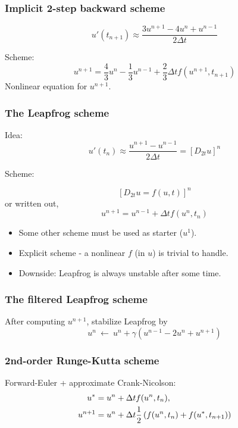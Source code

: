 \documentclass{beamer}
\begin{document}
\begin{frame}
\frametitle{Implicit 2-step backward scheme}

 

\[ u'(t_{n+1}) \approx \frac{3u^{n+1} - 4u^{n} + u^{n-1}}{2\Delta t}\]

Scheme:
\[ u^{n+1} = \frac{4}{3}u^n - \frac{1}{3}u^{n-1} +
\frac{2}{3}\Delta t f(u^{n+1}, t_{n+1})
\label{decay:fd2:bw:2step}
\]
Nonlinear equation for $u^{n+1}$.
\end{frame}

\begin{frame}
\frametitle{The Leapfrog scheme}


Idea:
\begin{equation}
u'(t_n)\approx \frac{u^{n+1}-u^{n-1}}{2\Delta t} = [D_{2t} u]^n
\end{equation}

Scheme:

\[ [D_{2t} u = f(u,t)]^n\]
or written out,
\begin{equation}
u^{n+1} = u^{n-1} + \Delta t f(u^n, t_n)
\label{decay:fd2:leapfrog}
\end{equation}

\begin{itemize}
 \item Some other scheme must be used as starter ($u^1$).

 \item Explicit scheme - a nonlinear $f$ (in $u$) is trivial to handle.

 \item Downside: Leapfrog is always unstable after some time.
\end{itemize}

\noindent
\end{frame}

\begin{frame}
\frametitle{The filtered Leapfrog scheme}


After computing $u^{n+1}$, stabilize Leapfrog by
\begin{equation}
u^n\ \leftarrow\ u^n + \gamma (u^{n-1} - 2u^n + u^{n+1})
\label{decay:fd2:leapfrog:filtered}
\end{equation}
\end{frame}

\begin{frame}
\frametitle{2nd-order Runge-Kutta scheme}


Forward-Euler + approximate Crank-Nicolson:
\begin{align}
u^* &= u^n + \Delta t f(u^n, t_n),
\label{decay:fd2:RK2:s1}\\ 
u^{n+1} &= u^n + \Delta t \half \left( f(u^n, t_n) + f(u^*, t_{n+1})
\right)
\label{decay:fd2:RK2:s2}
\end{align}
\end{frame}
\end{document}
